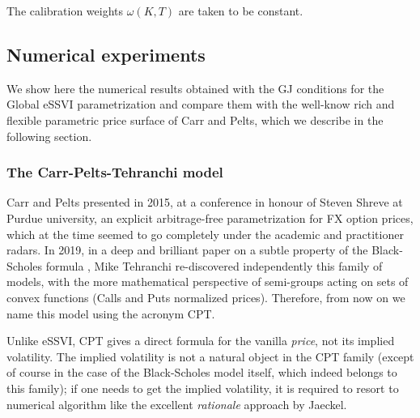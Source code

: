 \documentclass{article}
\begin{document}
The calibration weights \(\omega(K,T)\) are taken to be constant.

	\hypertarget{numerical-experiments}{%
\subsection{Numerical experiments}\label{numerical-experiments}}

	We show here the numerical results obtained with the GJ conditions for
the Global eSSVI parametrization and compare them with the well-know
rich and flexible parametric price surface of Carr and Pelts, which we
describe in the following section.

	\hypertarget{the-carr-pelts-tehranchi-model}{%
\subsubsection{The Carr-Pelts-Tehranchi
model}\label{the-carr-pelts-tehranchi-model}}

	Carr and Pelts presented in 2015, at a conference in honour of Steven
Shreve at Purdue university, an explicit arbitrage-free parametrization
for FX option prices, which at the time seemed to go completely under
the academic and practitioner radars. In 2019, in a deep and brilliant
paper on a subtle property of the Black-Scholes formula
\cite{tehranchi2020black}, Mike Tehranchi re-discovered independently
this family of models, with the more mathematical perspective of
semi-groups acting on sets of convex functions (Calls and Puts
normalized prices). Therefore, from now on we name this model using the
acronym CPT.

Unlike eSSVI, CPT gives a direct formula for the vanilla \emph{price},
not its implied volatility. The implied volatility is not a natural
object in the CPT family (except of course in the case of the
Black-Scholes model itself, which indeed belongs to this family); if one
needs to get the implied volatility, it is required to resort to
numerical algorithm like the excellent \emph{rationale} approach by
Jaeckel.
\end{document}
